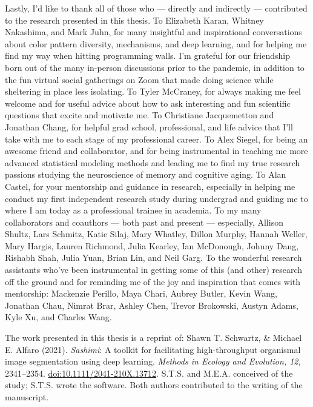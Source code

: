 {Lastly, I'd like to thank all of those who --- directly and indirectly --- contributed to the research presented in this thesis. To Elizabeth Karan, Whitney Nakashima, and Mark Juhn, for many insightful and inspirational conversations about color pattern diversity, mechanisms, and deep learning, and for helping me find my way when hitting programming walls. I'm grateful for our friendship born out of the many in-person discussions prior to the pandemic, in addition to the fun virtual social gatherings on Zoom that made doing science while sheltering in place less isolating. To Tyler McCraney, for always making me feel welcome and for useful advice about how to ask interesting and fun scientific questions that excite and motivate me. To Christiane Jacquemetton and Jonathan Chang, for helpful grad school, professional, and life advice that I'll take with me to each stage of my professional career. To Alex Siegel, for being an awesome friend and collaborator, and for being instrumental in teaching me more advanced statistical modeling methods and leading me to find my true research passions studying the neuroscience of memory and cognitive aging. To Alan Castel, for your mentorship and guidance in research, especially in helping me conduct my first independent research study during undergrad and guiding me to where I am today as a professional trainee in academia. To my many collaborators and coauthors --- both past and present --- especially, Allison Shultz, Lars Schmitz, Katie Silaj, Mary Whatley, Dillon Murphy, Hannah Weller, Mary Hargis, Lauren Richmond, Julia Kearley, Ian McDonough, Johnny Dang, Rishabh Shah, Julia Yuan, Brian Lin, and Neil Garg. To the wonderful research assistants who've been instrumental in getting some of this (and other) research off the ground and for reminding me of the joy and inspiration that comes with mentorship: Mackenzie Perillo, Maya Chari, Aubrey Butler, Kevin Wang, Jonathan Chau, Nimrat Brar, Ashley Chen, Trevor Brokowski, Austyn Adams, Kyle Xu, and Charles Wang.

The work presented in this thesis is a reprint of: Shawn T. Schwartz, \& Michael E. Alfaro (2021). \emph{Sashimi}: A toolkit for facilitating high-throughput organismal image segmentation using deep learning. \textit{Methods in Ecology and Evolution, 12}, 2341–2354. \href{https://doi.org/10.1111/2041-210X.13712}{doi:10.1111/2041-210X.13712}. S.T.S. and M.E.A. conceived of the study; S.T.S. wrote the software. Both authors contributed to the writing of the manuscript.}